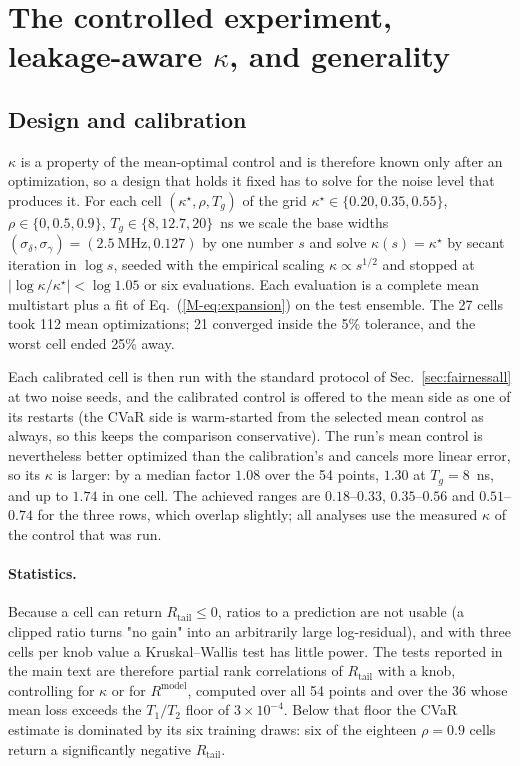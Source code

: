 \documentclass[aps,pra,onecolumn,notitlepage,superscriptaddress,nofootinbib,floatfix]{revtex4-2}
\newcommand{\Rt}{R_{\mathrm{tail}}}
\newcommand{\Rm}{R^{\mathrm{model}}}
\begin{document}
\section{The controlled experiment, leakage-aware $\kappa$, and generality}
\label{sec:stage3}

\subsection{Design and calibration}
\label{sec:stage3design}

$\kappa$ is a property of the mean-optimal control and is therefore known only
after an optimization, so a design that holds it fixed has to solve for the
noise level that produces it. For each cell $(\kappa^\star,\rho,T_g)$ of the
grid $\kappa^\star\in\{0.20,0.35,0.55\}$, $\rho\in\{0,0.5,0.9\}$,
$T_g\in\{8,12.7,20\}$~ns we scale the base widths
$(\sigma_\delta,\sigma_\gamma)=(2.5~\mathrm{MHz},0.127)$ by one number $s$ and
solve $\kappa(s)=\kappa^\star$ by secant iteration in $\log s$, seeded with the
empirical scaling $\kappa\propto s^{1/2}$ and stopped at
$|\log\kappa/\kappa^\star|<\log 1.05$ or six evaluations. Each evaluation is a
complete mean multistart plus a fit of Eq.~(\ref{M-eq:expansion}) on the test
ensemble. The 27 cells took 112 mean optimizations; 21 converged inside the
5\% tolerance, and the worst cell ended 25\% away.

Each calibrated cell is then run with the standard protocol of
Sec.~\ref{sec:fairnessall} at two noise seeds, and the calibrated control is offered
to the mean side as one of its restarts (the CVaR side is warm-started from
the selected mean control as always, so this keeps the comparison
conservative). The run's mean control is nevertheless better optimized than
the calibration's and cancels more linear error, so its $\kappa$ is larger:
by a median factor $1.08$ over the 54 points, $1.30$ at $T_g=8$~ns, and up to
$1.74$ in one cell. The achieved ranges are $0.18$--$0.33$, $0.35$--$0.56$ and
$0.51$--$0.74$ for the three rows, which overlap slightly; all analyses use the
measured $\kappa$ of the control that was run.

\paragraph*{Statistics.} Because a cell can return $\Rt\le0$, ratios to a
prediction are not usable (a clipped ratio turns "no gain" into an arbitrarily
large log-residual), and with three cells per knob value a Kruskal--Wallis test
has little power. The tests reported in the main text are therefore partial
rank correlations of $\Rt$ with a knob, controlling for $\kappa$ or for $\Rm$,
computed over all 54 points and over the 36 whose mean loss exceeds the
$T_1/T_2$ floor of $3\times10^{-4}$. Below that floor the CVaR estimate is
dominated by its six training draws: six of the eighteen $\rho=0.9$ cells
return a significantly negative $\Rt$.
\end{document}
